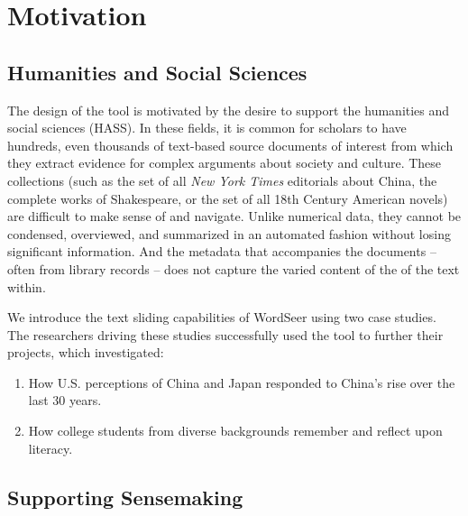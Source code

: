 \documentclass{sig-alternate}
\begin{document}
\section{Motivation}

\subsection{Humanities and Social Sciences}
The design of the tool is motivated by the desire to support the humanities and social sciences (HASS). In these fields, it is common for scholars to have hundreds, even thousands of text-based source documents of interest from which they extract evidence for complex arguments about society and culture. These collections (such as the set of all \emph{New York Times} editorials about China, the complete works of Shakespeare, or the set of all 18th Century American novels)  are difficult to make sense of and navigate. Unlike numerical data, they cannot be condensed, overviewed, and summarized in an automated fashion without losing significant information. And the metadata that accompanies the documents -- often from library records -- does not capture the varied content of the of the text within.

We introduce the text sliding capabilities of WordSeer using two case studies. The researchers driving these studies successfully used the tool to further their projects, which investigated:
\begin{enumerate}
	\item How U.S. perceptions of China and Japan responded to China's rise over the last 30 years.
	\item How college students from diverse backgrounds remember and reflect upon literacy.
\end{enumerate}


\subsection{Supporting Sensemaking}
\end{document}
